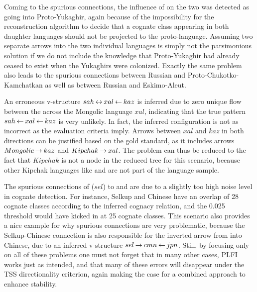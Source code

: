  Coming to the spurious connections, the influence of  on the two  was detected as going into Pro\-to-Yu\-ka\-ghir, again because of the impossibility for the reconstruction algorithm to decide that a cognate class appearing in both daughter languages should not be projected to the proto-lan\-guage. Assuming two separate arrows into the two individual languages is simply not the parsimonious solution if we do not include the knowledge that Proto-Yukaghir had already ceased to exist when the Yukaghirs were colonized. Exactly the same problem also leads to the spurious connections between Russian and Proto-Chukotko-Kamchatkan as well as between Russian and Eskimo-Aleut.
 
 An erroneous v-structure $sah \kern 2pt\hbox{$\leftrightarrow$}\kern 2pt xal \kern 2pt\hbox{$\leftarrow$}\kern 2pt kaz$ is inferred due to zero unique flow between the  across the Mongolic language $xal$, indicating that the true pattern $sah \kern 2pt\hbox{$\leftarrow$}\kern 2pt xal \kern 2pt\hbox{$\leftarrow$}\kern 2pt kaz$ is very unlikely. In fact, the inferred configuration is not as incorrect as the evaluation criteria imply. Arrows between $xal$ and $kaz$ in both directions can be justified based on the gold standard, as it includes arrows $Mongolic \kern 2pt\hbox{$\rightarrow$}\kern 2pt kaz$ and $Kipchak \kern 2pt\hbox{$\rightarrow$}\kern 2pt xal$. The problem can thus be reduced to the fact that $Kipchak$ is not a node in the reduced tree for this scenario, because other Kipchak languages like  and  are not part of the language sample.
 
 The spurious connections of  ($sel$) to  and  are due to a slightly too high noise level in cognate detection. For instance, Selkup and Chinese have an overlap of 28 cognate classes according to the inferred cognacy relation, and the 0.025 threshold would have kicked in at 25 cognate classes. This scenario also provides a nice example for why spurious connections are very problematic, because the Selkup-Chinese connection is also responsible for the inverted arrow from  into Chinese, due to an inferred v-structure $sel \kern 2pt\hbox{$\rightarrow$}\kern 2pt cmn \kern 2pt\hbox{$\leftarrow$}\kern 2pt jpn$. Still, by focusing only on all of these problems one must not forget that in many other cases, PLFI works just as intended, and that many of these errors will disappear under the TSS directionality criterion, again making the case for a combined approach to enhance stability.
 
